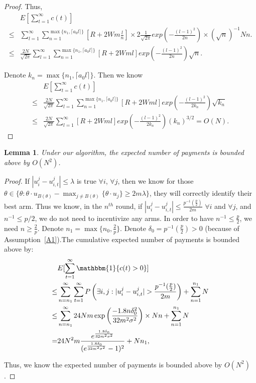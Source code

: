 \documentclass{article}
\newtheorem{lemma}{Lemma}
\begin{document}
\begin{proof}
Thus,
\begin{align}
&E\left[\sum_{t=1}^{\infty}c(t)\right] \nonumber\\
\leq & \sum_{l=1}^{\infty}\sum_{n=1}^{\max\{n_1,\lceil a_0 l\rceil\}}\left[R+2Wm\frac{l}{n}\right]\times 2 \frac{1}{\sqrt{2\pi}}exp\left(-\frac{(l-1)^2}{2n}\right)\times (\sqrt{n})^{-1}Nn. \nonumber \\
\leq & \frac{2N}{\sqrt{2\pi}}\sum_{l=1}^{\infty}\sum_{n=1}^{\max\{n_1,\lceil a_0 l\rceil\}}\left[R+2Wml\right]exp\left(-\frac{(l-1)^2}{2n}\right)\sqrt{n}. \nonumber
\end{align}

Denote $k_n=\max\{n_1, \lceil a_0 l \rceil\}$. Then we know
\begin{align}
&E\left[\sum_{t=1}^{\infty}c(t)\right] \nonumber\\
\leq & \frac{2N}{\sqrt{2\pi}}\sum_{l=1}^{\infty}\sum_{n=1}^{\max\{n_1,\lceil a_0 l\rceil\}}\left[R+2Wml\right]exp\left(-\frac{(l-1)^2}{2k_n}\right)\sqrt{k_n} \nonumber \\
\leq & \frac{2N}{\sqrt{2\pi}}\sum_{l=1}^{\infty}\left[R+2Wml\right]exp\left(-\frac{(l-1)^2}{2k_n}\right)(k_n)^{3/2}=O(N). \nonumber
\end{align}


\end{proof}


\begin{lemma}
Under our algorithm, the expected number of payments is bounded above by $O(N^2)$.
\end{lemma}

\begin{proof}
If $|u_{i}^{j}-u_{i,t}^{j}|\leq \lambda$ is true $\forall i$, $\forall j$, then we know for those $\theta\in \{\theta:\theta\cdot u_{B(\theta)}-\max_{j\neq B(\theta)}\{\theta \cdot u_{j}\}\geq 2m\lambda\}$, they will correctly identify their best arm. Thus we know, in the $n^{th}$ round, if $|u_{i}^{j}-u_{i,t}^{j}|\leq \frac{p^{-1}(\frac{p}{2})}{2m}$ $\forall i$ and $\forall j$, and $n^{-1}\leq p/2$, we do not need to incentivize any arms. In order to have $n^{-1}\leq \frac{p}{2}$, we need $n\geq \frac{2}{p}$. Denote $n_1=\max\{n_{0}, \frac{2}{p}\}$. Denote $\delta_{0}=p^{-1}(\frac{p}{2})>0$ (because of Assumption~\ref{A1}).The cumulative expected number of payments is bounded above by:
\begin{align}
&E[\sum_{t=1}^{\infty}\mathbbm{1}\{c(t)>0\}] \nonumber \\
\leq &\sum_{n=n_{1}}^{\infty}\sum_{t=1}^{\infty}P\left(\exists i,j:|u_{i}^{j}-u_{i,t}^{j}|>\frac{p^{-1}(\frac{p}{2})}{2m}\right)+\sum_{n=1}^{n_1}N \nonumber \\
\leq & \sum_{n=n_{1}}^{\infty}24Nm \exp\left(\frac{-1.8 n\delta_{0}^2}{32m^2\sigma^2}\right)\times Nn+\sum_{n=1}^{n_1}N \nonumber  \\
=&24N^2 m \frac{e^{\frac{1.8\delta_{0}}{32m^2\sigma^2}}}{(e^{\frac{1.8\delta_{0}}{32m^2\sigma^2}}-1)^2} + Nn_1, \nonumber
\end{align}

Thus, we know the expected number of payments is bounded above by $O(N^2)$.

\end{proof}
\end{document}
